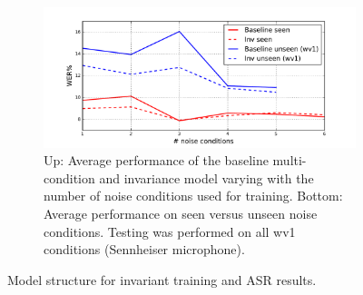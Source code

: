 \documentclass{article}
\begin{document}
\begin{figure}
\begin{subfigure}[b]{0.7\linewidth}
        \includegraphics[width=\linewidth]{wer_seen_unseen.pdf}
        \caption{Up: Average performance of the baseline multi-condition and invariance model varying with  the number of noise
            conditions used for training. Bottom: Average performance on seen versus unseen noise conditions.
            Testing was performed on all wv1 conditions (Sennheiser microphone).
            }
        \label{fig:results}
    \end{subfigure}
    \caption{Model structure for invariant training and ASR results.}
\end{figure}



    

    
\end{document}
